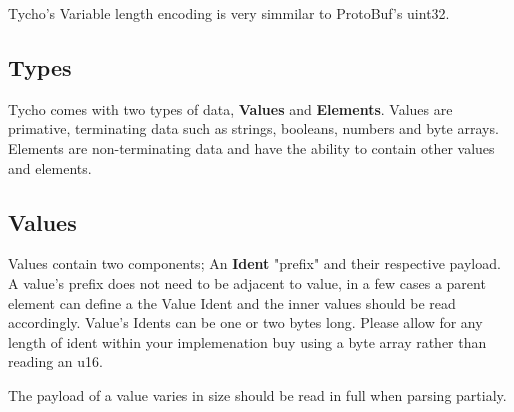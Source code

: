 \documentclass{report}
\begin{document}
Tycho's Variable length encoding is very simmilar to ProtoBuf's uint32.

\subsection{Types}
Tycho comes with two types of data, \textbf{Values} and \textbf{Elements}. Values are primative, terminating data such as
strings, booleans, numbers and byte arrays. Elements are non-terminating data and have the ability to contain other
values and elements.

\subsection{Values}
 Values contain two components; An \textbf{Ident} "prefix" and their respective payload. A value's prefix does not need
 to be adjacent to value, in a few cases a parent element can define a the Value Ident and the inner values should
 be read accordingly. Value's Idents can be one or two bytes long.
 Please allow for any length of ident within your implemenation buy using a byte array rather than reading an u16.

 The payload of a value varies in size should be read in full when parsing partialy.

\newpage
\end{document}
